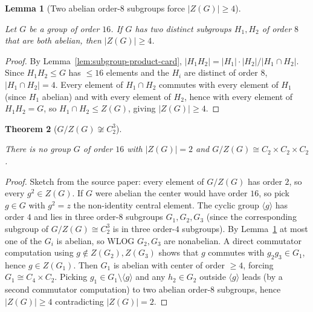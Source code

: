 \documentclass{article}
\newtheorem{theorem}{Theorem}[section]
\newtheorem{lemma}[theorem]{Lemma}
\theoremstyle{definition}
\newcommand{\lean}[1]{}
\newcommand{\leanok}{}
\newcommand{\leanfile}[1]{}
\newcommand{\uses}[1]{}
\begin{document}
\begin{lemma}[Two abelian order-$8$ subgroups force $|Z(G)| \ge 4$]
    \label{lem:two-abelian-subgroups-force-center-four}
    \lean{OrderSixteen.Prelim.two_abelian_subgroups_force_center_four}
    \leanfile{M2rGroup7/SixteenCase.lean}
    \uses{lem:subgroup-product-card}
    \leanok
    Let $G$ be a group of order $16$. If $G$ has two distinct subgroups
    $H_1, H_2$ of order $8$ that are both abelian, then $|Z(G)| \ge 4$.
\end{lemma}
\begin{proof}
    \uses{lem:subgroup-product-card}
    By Lemma~\ref{lem:subgroup-product-card}, $|H_1 H_2| = |H_1| \cdot |H_2|
    / |H_1 \cap H_2|$. Since $H_1 H_2 \le G$ has $\le 16$ elements and the
    $H_i$ are distinct of order $8$, $|H_1 \cap H_2| = 4$. Every element of
    $H_1 \cap H_2$ commutes with every element of $H_1$ (since $H_1$
    abelian) and with every element of $H_2$, hence with every element of
    $H_1 H_2 = G$, so $H_1 \cap H_2 \le Z(G)$, giving $|Z(G)| \ge 4$.
\end{proof}

\begin{theorem}[$G/Z(G) \not\cong C_2^3$]
    \label{thm:no-Z2cubed-quotient}
    \uses{lem:two-abelian-subgroups-force-center-four,
          lem:order-eight-classification,lem:gi-abelian-when-center-four}
    There is no group $G$ of order $16$ with $|Z(G)| = 2$ and
    $G/Z(G) \cong C_2 \times C_2 \times C_2$.
\end{theorem}
\begin{proof}
    \uses{lem:two-abelian-subgroups-force-center-four,
          lem:order-eight-classification}
    Sketch from the source paper: every element of $G/Z(G)$ has order $2$,
    so every $g^2 \in Z(G)$. If $G$ were abelian the center would have order
    $16$, so pick $g \in G$ with $g^2 = z$ the non-identity central element.
    The cyclic group $\langle g \rangle$ has order $4$ and lies in three
    order-$8$ subgroups $G_1, G_2, G_3$ (since the corresponding subgroup of
    $G/Z(G) \cong C_2^3$ is in three order-$4$ subgroups). By
    Lemma~\ref{lem:two-abelian-subgroups-force-center-four} at most one of
    the $G_i$ is abelian, so WLOG $G_2, G_3$ are nonabelian. A direct
    commutator computation using $g \notin Z(G_2), Z(G_3)$ shows that $g$
    commutes with $g_2 g_3 \in G_1$, hence $g \in Z(G_1)$. Then $G_1$ is
    abelian with center of order $\ge 4$, forcing $G_1 \cong C_4 \times
    C_2$. Picking $g_1 \in G_1 \setminus \langle g \rangle$ and any
    $h_2 \in G_2$ outside $\langle g\rangle$ leads (by a second commutator
    computation) to two abelian order-$8$ subgroups, hence
    $|Z(G)| \ge 4$ contradicting $|Z(G)| = 2$.
\end{proof}
\end{document}
